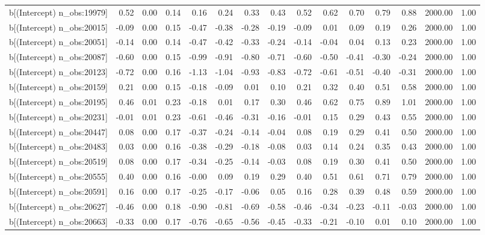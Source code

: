 \begin{table}[ht]
\begin{tabular}{rrrrrrrrrrrrrrr}
  b[(Intercept) n\_obs:19979] & 0.52 & 0.00 & 0.14 & 0.16 & 0.24 & 0.33 & 0.43 & 0.52 & 0.62 & 0.70 & 0.79 & 0.88 & 2000.00 & 1.00 \\ 
  b[(Intercept) n\_obs:20015] & -0.09 & 0.00 & 0.15 & -0.47 & -0.38 & -0.28 & -0.19 & -0.09 & 0.01 & 0.09 & 0.19 & 0.26 & 2000.00 & 1.00 \\ 
  b[(Intercept) n\_obs:20051] & -0.14 & 0.00 & 0.14 & -0.47 & -0.42 & -0.33 & -0.24 & -0.14 & -0.04 & 0.04 & 0.13 & 0.23 & 2000.00 & 1.00 \\ 
  b[(Intercept) n\_obs:20087] & -0.60 & 0.00 & 0.15 & -0.99 & -0.91 & -0.80 & -0.71 & -0.60 & -0.50 & -0.41 & -0.30 & -0.24 & 2000.00 & 1.00 \\ 
  b[(Intercept) n\_obs:20123] & -0.72 & 0.00 & 0.16 & -1.13 & -1.04 & -0.93 & -0.83 & -0.72 & -0.61 & -0.51 & -0.40 & -0.31 & 2000.00 & 1.00 \\ 
  b[(Intercept) n\_obs:20159] & 0.21 & 0.00 & 0.15 & -0.18 & -0.09 & 0.01 & 0.10 & 0.21 & 0.32 & 0.40 & 0.51 & 0.58 & 2000.00 & 1.00 \\ 
  b[(Intercept) n\_obs:20195] & 0.46 & 0.01 & 0.23 & -0.18 & 0.01 & 0.17 & 0.30 & 0.46 & 0.62 & 0.75 & 0.89 & 1.01 & 2000.00 & 1.00 \\ 
  b[(Intercept) n\_obs:20231] & -0.01 & 0.01 & 0.23 & -0.61 & -0.46 & -0.31 & -0.16 & -0.01 & 0.15 & 0.29 & 0.43 & 0.55 & 2000.00 & 1.00 \\ 
  b[(Intercept) n\_obs:20447] & 0.08 & 0.00 & 0.17 & -0.37 & -0.24 & -0.14 & -0.04 & 0.08 & 0.19 & 0.29 & 0.41 & 0.50 & 2000.00 & 1.00 \\ 
  b[(Intercept) n\_obs:20483] & 0.03 & 0.00 & 0.16 & -0.38 & -0.29 & -0.18 & -0.08 & 0.03 & 0.14 & 0.24 & 0.35 & 0.43 & 2000.00 & 1.00 \\ 
  b[(Intercept) n\_obs:20519] & 0.08 & 0.00 & 0.17 & -0.34 & -0.25 & -0.14 & -0.03 & 0.08 & 0.19 & 0.30 & 0.41 & 0.50 & 2000.00 & 1.00 \\ 
  b[(Intercept) n\_obs:20555] & 0.40 & 0.00 & 0.16 & -0.00 & 0.09 & 0.19 & 0.29 & 0.40 & 0.51 & 0.61 & 0.71 & 0.79 & 2000.00 & 1.00 \\ 
  b[(Intercept) n\_obs:20591] & 0.16 & 0.00 & 0.17 & -0.25 & -0.17 & -0.06 & 0.05 & 0.16 & 0.28 & 0.39 & 0.48 & 0.59 & 2000.00 & 1.00 \\ 
  b[(Intercept) n\_obs:20627] & -0.46 & 0.00 & 0.18 & -0.90 & -0.81 & -0.69 & -0.58 & -0.46 & -0.34 & -0.23 & -0.11 & -0.03 & 2000.00 & 1.00 \\ 
  b[(Intercept) n\_obs:20663] & -0.33 & 0.00 & 0.17 & -0.76 & -0.65 & -0.56 & -0.45 & -0.33 & -0.21 & -0.10 & 0.01 & 0.10 & 2000.00 & 1.00 \\ 

\end{tabular}
\end{table}
